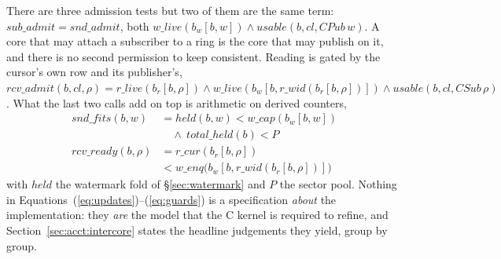 \documentclass[10pt,journal,compsoc,twocolumn]{article}
\theoremstyle{definition}
\theoremstyle{remark}
\theoremstyle{plain}
\begin{document}
There are three admission tests but two of them are the same term:
\(\mathit{sub\_admit} = \mathit{snd\_admit}\), both
\(\mathit{w\_live}(b_w[b,w]) \wedge \mathit{usable}(b,\mathit{cl},\mathit{CPub}\,w)\).
A core that may attach a subscriber to a ring is the core that may publish on
it, and there is no second permission to keep consistent. Reading is gated by
the cursor's own row and its publisher's,
\(\mathit{rcv\_admit}(b,\mathit{cl},\rho) =
\mathit{r\_live}(b_r[b,\rho]) \wedge
\mathit{w\_live}(b_w[b,\mathit{r\_wid}(b_r[b,\rho])]) \wedge
\mathit{usable}(b,\mathit{cl},\mathit{CSub}\,\rho)\).
What the last two calls add on top is arithmetic on derived counters,
\begin{equation}
\label{eq:guards}
\begin{aligned}
\mathit{snd\_fits}(b,w) &= \mathit{held}(b,w) < \mathit{w\_cap}(b_w[b,w])\\
 &\quad \wedge\ \mathit{total\_held}(b) < P\\
\mathit{rcv\_ready}(b,\rho) &= \mathit{r\_cur}(b_r[b,\rho])\\
 &< \mathit{w\_enq}\big(b_w[b,\mathit{r\_wid}(b_r[b,\rho])]\big)
\end{aligned}
\end{equation}
with \(\mathit{held}\) the watermark fold of \S\ref{sec:watermark} and \(P\) the
sector pool. Nothing in Equations~(\ref{eq:updates})--(\ref{eq:guards}) is a
specification \emph{about} the implementation: they \emph{are} the model that the
C kernel is required to refine, and Section~\ref{sec:acct:intercore} states the
headline judgements they yield, group by group.
\end{document}
